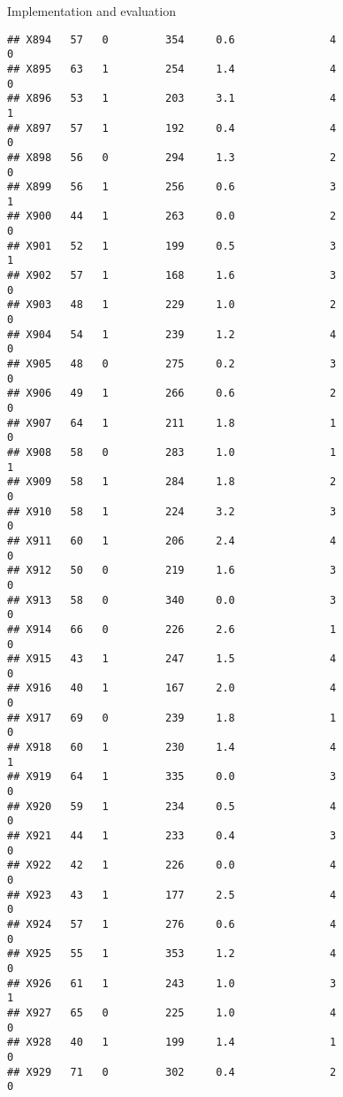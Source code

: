 \documentclass[
  ignorenonframetext,
]{beamer}
\begin{document}
\begin{frame}[fragile]{Implementation and evaluation}
\begin{verbatim}
## X894   57   0         354     0.6               4                   0
## X895   63   1         254     1.4               4                   0
## X896   53   1         203     3.1               4                   1
## X897   57   1         192     0.4               4                   0
## X898   56   0         294     1.3               2                   0
## X899   56   1         256     0.6               3                   1
## X900   44   1         263     0.0               2                   0
## X901   52   1         199     0.5               3                   1
## X902   57   1         168     1.6               3                   0
## X903   48   1         229     1.0               2                   0
## X904   54   1         239     1.2               4                   0
## X905   48   0         275     0.2               3                   0
## X906   49   1         266     0.6               2                   0
## X907   64   1         211     1.8               1                   0
## X908   58   0         283     1.0               1                   1
## X909   58   1         284     1.8               2                   0
## X910   58   1         224     3.2               3                   0
## X911   60   1         206     2.4               4                   0
## X912   50   0         219     1.6               3                   0
## X913   58   0         340     0.0               3                   0
## X914   66   0         226     2.6               1                   0
## X915   43   1         247     1.5               4                   0
## X916   40   1         167     2.0               4                   0
## X917   69   0         239     1.8               1                   0
## X918   60   1         230     1.4               4                   1
## X919   64   1         335     0.0               3                   0
## X920   59   1         234     0.5               4                   0
## X921   44   1         233     0.4               3                   0
## X922   42   1         226     0.0               4                   0
## X923   43   1         177     2.5               4                   0
## X924   57   1         276     0.6               4                   0
## X925   55   1         353     1.2               4                   0
## X926   61   1         243     1.0               3                   1
## X927   65   0         225     1.0               4                   0
## X928   40   1         199     1.4               1                   0
## X929   71   0         302     0.4               2                   0

\end{verbatim}
\end{frame}
\end{document}
